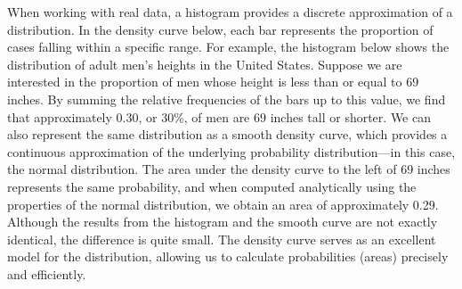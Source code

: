 \documentclass[
  letterpaper,
  DIV=11,
  numbers=noendperiod]{scrreprt}
\begin{document}
When working with real data, a histogram provides a discrete
approximation of a distribution. In the density curve below, each bar
represents the proportion of cases falling within a specific range. For
example, the histogram below shows the distribution of adult men's
heights in the United States. Suppose we are interested in the
proportion of men whose height is less than or equal to 69 inches. By
summing the relative frequencies of the bars up to this value, we find
that approximately 0.30, or 30\%, of men are 69 inches tall or shorter.
We can also represent the same distribution as a smooth density curve,
which provides a continuous approximation of the underlying probability
distribution---in this case, the normal distribution. The area under the
density curve to the left of 69 inches represents the same probability,
and when computed analytically using the properties of the normal
distribution, we obtain an area of approximately 0.29. Although the
results from the histogram and the smooth curve are not exactly
identical, the difference is quite small. The density curve serves as an
excellent model for the distribution, allowing us to calculate
probabilities (areas) precisely and efficiently.
\end{document}
